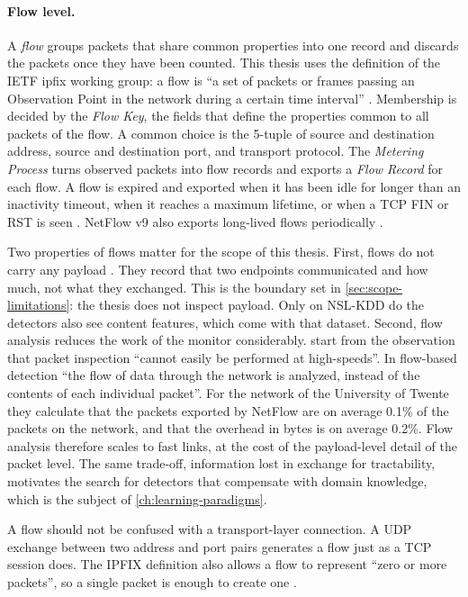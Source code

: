 \paragraph{Flow level.}
A \emph{flow} groups packets that share common properties into one record
and discards the packets once they have been counted. This thesis uses the
definition of the IETF \gls{ipfix} working group: a flow is ``a set of
packets or frames passing an Observation Point in the network during a
certain time interval'' \citep{claise2013rfc7011}. Membership is decided by
the \emph{Flow Key}, the fields that define the properties common to all
packets of the flow. A common choice is the 5-tuple of source and
destination address, source and destination port, and transport protocol.
The \emph{Metering Process} turns observed packets into flow records and
exports a \emph{Flow Record} for each flow. A flow is expired and exported
when it has been idle for longer than an inactivity timeout, when it reaches
a maximum lifetime, or when a TCP FIN or RST is seen
\citep{sperotto2010flowbased}. NetFlow v9 also exports long-lived flows
periodically \citep{claise2004rfc3954}.

Two properties of flows matter for the scope of this thesis. First, flows do
not carry any payload \citep{sperotto2010flowbased}. They record that two
endpoints communicated and how much, not what they exchanged. This is the
boundary set in \cref{sec:scope-limitations}: the thesis does not inspect
payload. Only on NSL-KDD do the detectors also see content features, which
come with that dataset. Second,
flow analysis reduces the work of the monitor considerably.
\citet{sperotto2010flowbased} start from the observation that packet
inspection ``cannot easily be performed at high-speeds''. In flow-based
detection ``the flow of data through the network is analyzed, instead of the
contents of each individual packet''. For the network of the University of
Twente they calculate that the packets exported by NetFlow are on average
0.1\% of the packets on the network, and that the overhead in bytes is on
average 0.2\%. Flow analysis therefore scales to fast links, at the cost of
the payload-level detail of the packet level. The same trade-off,
information lost in exchange for tractability, motivates the search for
detectors that compensate with domain knowledge, which is the subject of
\cref{ch:learning-paradigms}.

A flow should not be confused with a transport-layer connection. A UDP
exchange between two address and port pairs generates a flow just as a TCP
session does. The IPFIX definition also allows a flow to represent ``zero or
more packets'', so a single packet is enough to create one
\citep{claise2013rfc7011,sperotto2010flowbased}.

